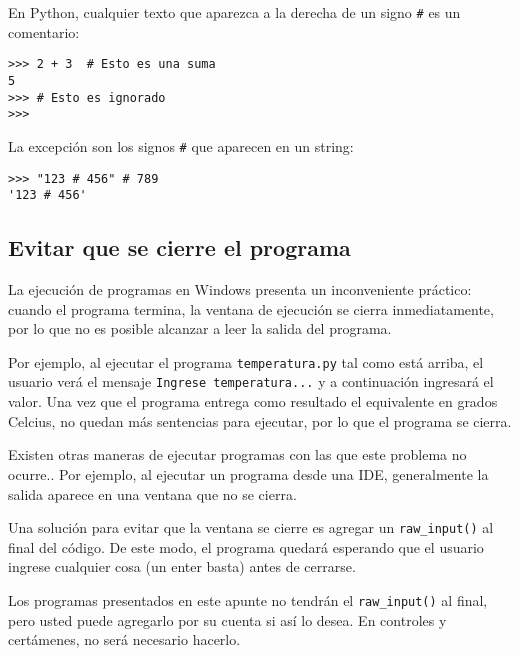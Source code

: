 En Python, cualquier texto que aparezca a la derecha de un signo
\lstinline!#! es un comentario:

\begin{lstlisting}
>>> 2 + 3  # Esto es una suma
5
>>> # Esto es ignorado
>>>
\end{lstlisting}

La excepción son los signos \lstinline!#! que aparecen en un string:

\begin{lstlisting}
>>> "123 # 456" # 789
'123 # 456'
\end{lstlisting}

\subsection{Evitar que se cierre el programa}

La ejecución de programas en Windows presenta un inconveniente práctico:
cuando el programa termina, la ventana de ejecución se cierra
inmediatamente, por lo que no es posible alcanzar a leer la salida del
programa.

Por ejemplo, al ejecutar el programa \lstinline!temperatura.py! tal como
está arriba, el usuario verá el mensaje
\lstinline!Ingrese temperatura...! y a continuación ingresará el valor.
Una vez que el programa entrega como resultado el equivalente en grados
Celcius, no quedan más sentencias para ejecutar, por lo que el programa
se cierra.

Existen otras maneras de ejecutar programas con las que este problema no
ocurre.. Por ejemplo, al ejecutar un programa desde una IDE,
generalmente la salida aparece en una ventana que no se cierra.

Una solución para evitar que la ventana se cierre es agregar un
\lstinline!raw_input()! al final del código. De este modo, el programa
quedará esperando que el usuario ingrese cualquier cosa (un enter basta)
antes de cerrarse.

Los programas presentados en este apunte no tendrán el
\lstinline!raw_input()! al final, pero usted puede agregarlo por su
cuenta si así lo desea. En controles y certámenes, no será necesario
hacerlo.

